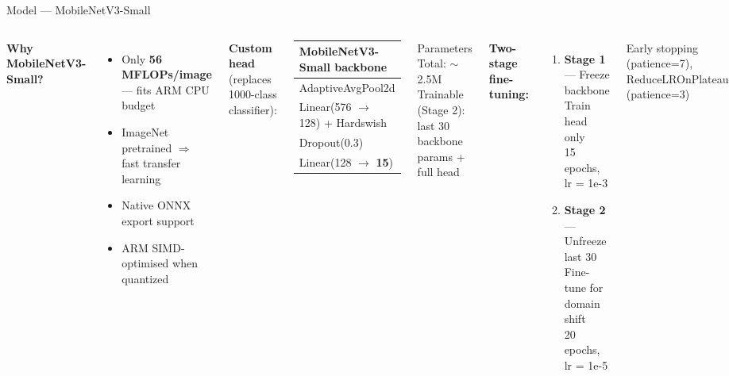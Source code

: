 \documentclass[aspectratio=169]{beamer}
\begin{document}
\begin{frame}{Model — MobileNetV3-Small}
  \begin{columns}
      \textbf{Why MobileNetV3-Small?}
      \begin{itemize}
        \item Only \textbf{56 MFLOPs/image} — fits ARM CPU budget
        \item ImageNet pretrained $\Rightarrow$ fast transfer learning
        \item Native ONNX export support
        \item ARM SIMD-optimised when quantized
      \end{itemize}
      \vspace{0.4cm}
      \textbf{Custom head} (replaces 1000-class classifier):
      \begin{center}
      \begin{tabular}{l}
        \toprule
        MobileNetV3-Small backbone \\
        \midrule
        AdaptiveAvgPool2d \\
        Linear(576 $\rightarrow$ 128) + Hardswish \\
        Dropout(0.3) \\
        Linear(128 $\rightarrow$ \textbf{15}) \\
        \bottomrule
      \end{tabular}
      \end{center}
      \begin{block}{Parameters}
        Total: $\sim$2.5M\\
        Trainable (Stage 2): last 30 backbone params + full head
      \end{block}
      \vspace{0.3cm}
      \textbf{Two-stage fine-tuning:}
      \begin{enumerate}
        \item \textbf{Stage 1} — Freeze backbone\\
              Train head only\\
              15 epochs, lr = 1e-3
        \item \textbf{Stage 2} — Unfreeze last 30\\
              Fine-tune for domain shift\\
              20 epochs, lr = 1e-5
      \end{enumerate}
      \vspace{0.2cm}
      \small Early stopping (patience=7),\\
      ReduceLROnPlateau (patience=3)
  \end{columns}
\end{frame}
\end{document}
